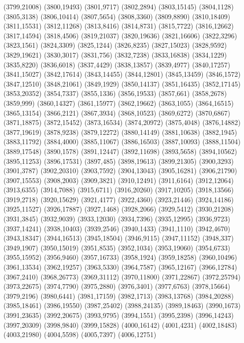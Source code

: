 (3799,21008)
(3800,19493)
(3801,9717)
(3802,2894)
(3803,15145)
(3804,1128)
(3805,3138)
(3806,10414)
(3807,5654)
(3808,3360)
(3809,8890)
(3810,18409)
(3811,15531)
(3812,11268)
(3813,8416)
(3814,8731)
(3815,7722)
(3816,12662)
(3817,14594)
(3818,4506)
(3819,21037)
(3820,19636)
(3821,16606)
(3822,3296)
(3823,1561)
(3824,3309)
(3825,1244)
(3826,8235)
(3827,15023)
(3828,9592)
(3829,19621)
(3830,3017)
(3831,756)
(3832,7238)
(3833,16838)
(3834,1229)
(3835,8220)
(3836,6018)
(3837,4429)
(3838,13857)
(3839,4977)
(3840,17257)
(3841,15027)
(3842,17614)
(3843,14455)
(3844,12801)
(3845,13459)
(3846,1572)
(3847,12510)
(3848,21061)
(3849,1929)
(3850,14137)
(3851,16435)
(3852,17145)
(3853,20352)
(3854,7337)
(3855,1336)
(3856,19533)
(3857,661)
(3858,2678)
(3859,999)
(3860,14327)
(3861,15977)
(3862,19662)
(3863,1055)
(3864,16515)
(3865,13154)
(3866,2121)
(3867,3934)
(3868,10523)
(3869,6272)
(3870,6867)
(3871,18875)
(3872,15452)
(3873,16534)
(3874,20972)
(3875,4048)
(3876,14882)
(3877,19619)
(3878,9238)
(3879,12272)
(3880,14149)
(3881,10638)
(3882,1945)
(3883,11792)
(3884,4000)
(3885,11067)
(3886,16503)
(3887,10093)
(3888,11504)
(3889,17548)
(3890,1578)
(3891,12447)
(3892,11698)
(3893,5658)
(3894,10562)
(3895,11253)
(3896,17531)
(3897,485)
(3898,19613)
(3899,21305)
(3900,3293)
(3901,3787)
(3902,20310)
(3903,7592)
(3904,13043)
(3905,16281)
(3906,21790)
(3907,15553)
(3908,2003)
(3909,3821)
(3910,12491)
(3911,6164)
(3912,12064)
(3913,6355)
(3914,7088)
(3915,6711)
(3916,20260)
(3917,10205)
(3918,13566)
(3919,2718)
(3920,15629)
(3921,4177)
(3922,4360)
(3923,21446)
(3924,14186)
(3925,11527)
(3926,17887)
(3927,1468)
(3928,2066)
(3929,5412)
(3930,21208)
(3931,3845)
(3932,9039)
(3933,12030)
(3934,7396)
(3935,12995)
(3936,9723)
(3937,14241)
(3938,10403)
(3939,2546)
(3940,1433)
(3941,1110)
(3942,4670)
(3943,18347)
(3944,16513)
(3945,18504)
(3946,9115)
(3947,11152)
(3948,337)
(3949,1907)
(3950,15019)
(3951,8535)
(3952,1034)
(3953,19060)
(3954,6733)
(3955,15952)
(3956,9460)
(3957,16733)
(3958,1924)
(3959,18258)
(3960,10496)
(3961,13534)
(3962,19257)
(3963,5330)
(3964,7587)
(3965,12167)
(3966,12784)
(3967,2410)
(3968,26773)
(3969,31112)
(3970,11800)
(3971,22867)
(3972,25794)
(3973,22675)
(3974,7790)
(3975,2880)
(3976,3401)
(3977,6763)
(3978,15664)
(3979,2196)
(3980,6441)
(3981,17159)
(3982,1713)
(3983,13768)
(3984,20288)
(3985,18461)
(3986,19550)
(3987,25402)
(3988,24135)
(3989,18463)
(3990,1673)
(3991,23635)
(3992,20675)
(3993,9795)
(3994,1551)
(3995,2398)
(3996,14243)
(3997,20309)
(3998,9840)
(3999,15828)
(4000,16142)
(4001,4231)
(4002,18483)
(4003,21980)
(4004,5598)
(4005,7397)
(4006,12751)
